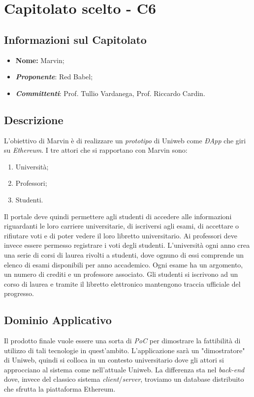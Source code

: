 \newpage
\section{Capitolato scelto - C6}
\subsection{Informazioni sul Capitolato}
\begin{itemize}
	\item \textbf{Nome:} Marvin;
	\item \textbf{\textit{Proponente}}: Red Babel;
	\item \textbf{\textit{Committenti}}: Prof. Tullio Vardanega, Prof. Riccardo Cardin.
\end{itemize}

\subsection{Descrizione}
L'obiettivo di Marvin è di realizzare un \textit{prototipo} di Uniweb come \textit{ÐApp} che giri su \textit{Ethereum}. I tre attori che si rapportano con Marvin sono:
\begin{enumerate}
	\item Università;
	\item Professori;
	\item Studenti.
\end{enumerate}
Il portale deve quindi permettere agli studenti di accedere alle informazioni riguardanti le loro carriere universitarie, di iscriversi agli esami, di accettare o rifiutare voti e di poter vedere il loro libretto universitario.
Ai professori deve invece essere permesso registrare i voti degli studenti.
L'università ogni anno crea una serie di corsi di laurea rivolti a studenti, dove ognuno di essi comprende un elenco di esami disponibili per anno accademico. Ogni esame ha un argomento, un numero di crediti e un professore associato. Gli studenti si iscrivono ad un corso di laurea e tramite il libretto elettronico mantengono traccia ufficiale del progresso.

\subsection{Dominio Applicativo}
Il prodotto finale vuole essere una sorta di \textit{PoC} per dimostrare la fattibilità di utilizzo di tali tecnologie in quest'ambito. L'applicazione sarà un "dimostratore" di Uniweb, quindi si colloca in un contesto universitario dove gli attori si approcciano al sistema come nell'attuale Uniweb. La differenza sta nel \textit{back-end} dove, invece del classico sistema \textit{client}/\textit{server}, troviamo un database distribuito che sfrutta la piattaforma Ethereum. 

